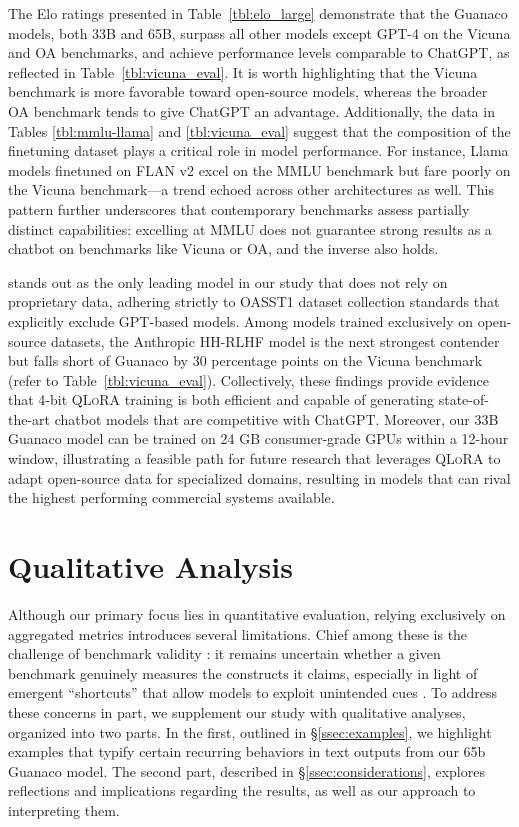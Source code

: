 The Elo ratings presented in Table~\ref{tbl:elo_large} demonstrate that the {Guanaco} models, both 33B and 65B, surpass all other models except GPT-4 on the Vicuna and OA benchmarks, and achieve performance levels comparable to ChatGPT, as reflected in Table~\ref{tbl:vicuna_eval}. It is worth highlighting that the Vicuna benchmark is more favorable toward open-source models, whereas the broader OA benchmark tends to give ChatGPT an advantage. Additionally, the data in Tables \ref{tbl:mmlu-llama} and \ref{tbl:vicuna_eval} suggest that the composition of the finetuning dataset plays a critical role in model performance. For instance, Llama models finetuned on FLAN v2 excel on the MMLU benchmark but fare poorly on the Vicuna benchmark—a trend echoed across other architectures as well. This pattern further underscores that contemporary benchmarks assess partially distinct capabilities: excelling at MMLU does not guarantee strong results as a chatbot on benchmarks like Vicuna or OA, and the inverse also holds.

 stands out as the only leading model in our study that does not rely on proprietary data, adhering strictly to OASST1 dataset collection standards that explicitly exclude GPT-based models. Among models trained exclusively on open-source datasets, the Anthropic HH-RLHF model is the next strongest contender but falls short of {Guanaco} by 30 percentage points on the Vicuna benchmark (refer to Table~\ref{tbl:vicuna_eval}). Collectively, these findings provide evidence that 4-bit \textsc{QLoRA} training is both efficient and capable of generating state-of-the-art chatbot models that are competitive with ChatGPT. Moreover, our 33B {Guanaco} model can be trained on 24 GB consumer-grade GPUs within a 12-hour window, illustrating a feasible path for future research that leverages \textsc{QLoRA} to adapt open-source data for specialized domains, resulting in models that can rival the highest performing commercial systems available.

\section{Qualitative Analysis}

Although our primary focus lies in quantitative evaluation, relying exclusively on aggregated metrics introduces several limitations. Chief among these is the challenge of benchmark validity \citep{liao2021we}: it remains uncertain whether a given benchmark genuinely measures the constructs it claims, especially in light of emergent “shortcuts” that allow models to exploit unintended cues \citep{gururangan2018annotation, poliak2018hypothesis}. To address these concerns in part, we supplement our study with qualitative analyses, organized into two parts. In the first, outlined in \S\ref{ssec:examples}, we highlight examples that typify certain recurring behaviors in text outputs from our 65b {Guanaco} model. The second part, described in \S\ref{ssec:considerations}, explores reflections and implications regarding the results, as well as our approach to interpreting them.

